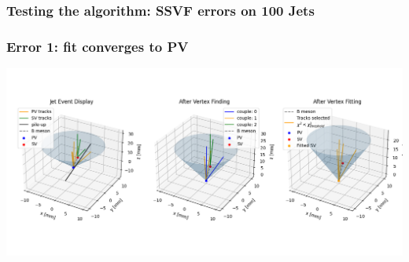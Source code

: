 \documentclass{beamer}
\begin{document}
\begin{frame}
    \frametitle{Testing the algorithm: SSVF errors on 100 Jets}
\end{frame}

\begin{frame}
    \frametitle{Error 1: fit converges to PV}
    \begin{center}
        \includegraphics[width=\textwidth]{../screenshots/misclassifiedPV.png}
    \end{center} 
\end{frame}
\end{document}
